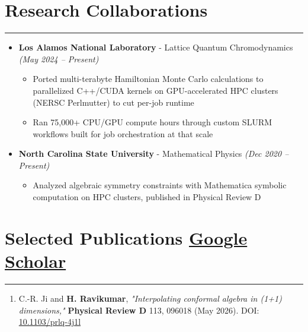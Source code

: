\documentclass[11pt]{article}
\begin{document}
\vspace{0.3em}
\section*{Research Collaborations}
\hrule
\vspace{-0.3em}
\begin{itemize}[label={}, leftmargin=0pt]
    \item \textbf{Los Alamos National Laboratory} - Lattice Quantum Chromodynamics \hfill \textit{(May 2024 -- Present)}
    \vspace{-0.5em}
    \begin{itemize}
        \item Ported multi-terabyte Hamiltonian Monte Carlo calculations to parallelized C++/CUDA kernels on GPU-accelerated HPC clusters (NERSC Perlmutter) to cut per-job runtime
        \vspace{-0.5em}
        \item Ran 75,000+ CPU/GPU compute hours through custom SLURM workflows built for job orchestration at that scale
    \end{itemize}

    \item \textbf{North Carolina State University} - Mathematical Physics \hfill \textit{(Dec 2020 -- Present)}
    \vspace{-0.5em}
    \begin{itemize}
        \item Analyzed algebraic symmetry constraints with Mathematica symbolic computation on HPC clusters, published in Physical Review D
    \end{itemize}
\end{itemize}

\vspace{0.3em}
\section*{Selected Publications \hfill \normalsize\normalfont \href{https://scholar.google.com/citations?user=o6cDFRwAAAAJ&hl=en}{Google Scholar}}
\hrule
\vspace{-0.3em}
\begin{enumerate}[leftmargin=1.5em]
    \item C.-R. Ji and \textbf{H. Ravikumar}, \textit{"Interpolating conformal algebra in (1+1) dimensions,"} \textbf{Physical Review D} 113, 096018 (May 2026). DOI: \href{https://doi.org/10.1103/prlq-4j1l}{10.1103/prlq-4j1l}
\end{enumerate}
\end{document}
